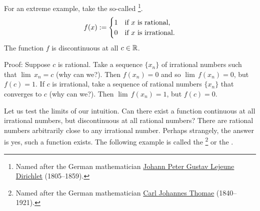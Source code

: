 \begin{example}
For an extreme example, take the so-called
\emph{}\footnote{Named after the German
mathematician
\href{https://en.wikipedia.org/wiki/Peter_Gustav_Lejeune_Dirichlet}{Johann Peter Gustav Lejeune
Dirichlet}
(1805--1859).}.
\begin{equation*}
f(x) :=
\begin{cases}
1 & \text{if } x \text{ is rational,} \\
0 & \text{if } x \text{ is irrational.}
\end{cases}
\avoidbreak
\end{equation*}
The function $f$ is discontinuous at all $c \in {\mathbb{R}}$.

Proof:
Suppose $c$ is rational.  Take a sequence $\{ x_n \}$
of irrational numbers such that $\lim\, x_n = c$ (why can we?).  Then $f(x_n) = 0$
and so $\lim\, f(x_n) = 0$, but $f(c) = 1$.
If $c$ is irrational, take a sequence of rational numbers $\{ x_n \}$
that converges to $c$ (why can we?).  Then $\lim\, f(x_n) = 1$, but $f(c) = 0$.
\end{example}

Let us test the limits of our intuition.  Can
there exist a function continuous at all irrational numbers, but
discontinuous at all rational numbers?  There are rational numbers
arbitrarily close to any irrational number.  Perhaps strangely, the
answer is yes, such a function exists.  The following example is called the
\emph{}\footnote{Named after the German
mathematician
\href{https://en.wikipedia.org/wiki/Carl_Johannes_Thomae}{Carl Johannes Thomae}
(1840--1921).} or the
\emph{}.

